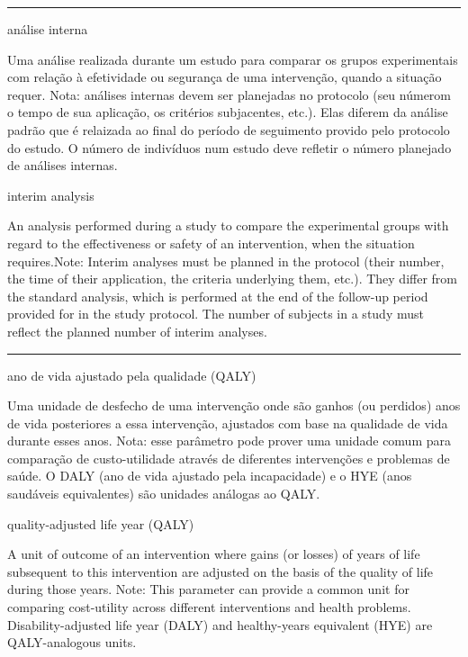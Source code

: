 \documentclass[
  openany]{book}
\begin{document}
\begin{center}\rule{0.5\linewidth}{0.5pt}\end{center}

análise interna

Uma análise realizada durante um estudo para comparar os grupos experimentais com relação à efetividade ou segurança de uma intervenção, quando a situação requer. Nota: análises internas devem ser planejadas no protocolo (seu númerom o tempo de sua aplicação, os critérios subjacentes, etc.). Elas diferem da análise padrão que é relaizada ao final do período de seguimento provido pelo protocolo do estudo. O número de indivíduos num estudo deve refletir o número planejado de análises internas.

interim analysis

An analysis performed during a study to compare the experimental groups with regard to the effectiveness or safety of an intervention, when the situation requires.Note: Interim analyses must be planned in the protocol (their number, the time of their application, the criteria underlying them, etc.). They differ from the standard analysis, which is performed at the end of the follow-up period provided for in the study protocol. The number of subjects in a study must reflect the planned number of interim analyses.

\begin{center}\rule{0.5\linewidth}{0.5pt}\end{center}

ano de vida ajustado pela qualidade (QALY)

Uma unidade de desfecho de uma intervenção onde são ganhos (ou perdidos) anos de vida posteriores a essa intervenção, ajustados com base na qualidade de vida durante esses anos. Nota: esse parâmetro pode prover uma unidade comum para comparação de custo-utilidade através de diferentes intervenções e problemas de saúde. O DALY (ano de vida ajustado pela incapacidade) e o HYE (anos saudáveis equivalentes) são unidades análogas ao QALY.

quality-adjusted life year (QALY)

A unit of outcome of an intervention where gains (or losses) of years of life subsequent to this intervention are adjusted on the basis of the quality of life during those years. Note: This parameter can provide a common unit for comparing cost-utility across different interventions and health problems. Disability-adjusted life year (DALY) and healthy-years equivalent (HYE) are QALY-analogous units.
\end{document}
